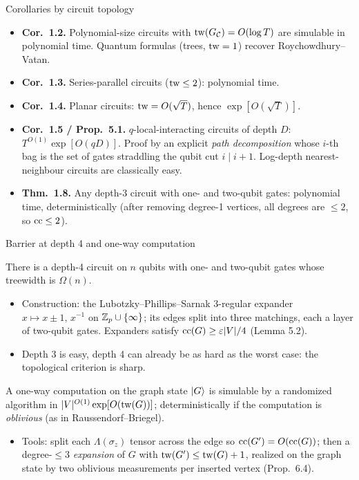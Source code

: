 \begin{frame}{Corollaries by circuit topology}
    \begin{itemize}
        \item \textbf{Cor.~1.2.} Polynomial-size circuits with $\operatorname{tw}(G_{\mathcal{C}})=O(\log T)$ are simulable in polynomial time. Quantum formulas (trees, $\operatorname{tw}=1$) recover Roychowdhury--Vatan.
        \item \textbf{Cor.~1.3.} Series-parallel circuits ($\operatorname{tw}\le 2$): polynomial time.
        \item \textbf{Cor.~1.4.} Planar circuits: $\operatorname{tw}=O(\sqrt{T})$, hence $\exp[O(\sqrt T)]$.
        \item \textbf{Cor.~1.5 / Prop.~5.1.} $q$-local-interacting circuits of depth $D$: $T^{O(1)}\exp[O(qD)]$. Proof by an explicit \emph{path decomposition} whose $i$-th bag is the set of gates straddling the qubit cut $i\mid i+1$. Log-depth nearest-neighbour circuits are classically easy.
        \item \textbf{Thm.~1.8.} Any depth-3 circuit with one- and two-qubit gates: polynomial time, deterministically (after removing degree-1 vertices, all degrees are $\le 2$, so $\operatorname{cc}\le 2$).
    \end{itemize}
\end{frame}

\begin{frame}{Barrier at depth 4 and one-way computation}
    \begin{thm}[Thm.~1.7]
        There is a depth-4 circuit on $n$ qubits with one- and two-qubit gates whose treewidth is $\Omega(n)$.
    \end{thm}
    \begin{itemize}
        \item Construction: the Lubotzky--Phillips--Sarnak 3-regular expander $x\mapsto x\pm1,\,x^{-1}$ on $\mathbb{Z}_p\cup\{\infty\}$; its edges split into three matchings, each a layer of two-qubit gates. Expanders satisfy $\operatorname{cc}(G)\ge\varepsilon|V|/4$ (Lemma 5.2).
        \item Depth 3 is easy, depth 4 can already be as hard as the worst case: the topological criterion is sharp.
    \end{itemize}
    \begin{thm}[Thm.~1.6 / 6.6]
        A one-way computation on the graph state $\ket{G}$ is simulable by a randomized algorithm in $|V|^{O(1)}\exp[O(\operatorname{tw}(G))]$; deterministically if the computation is \emph{oblivious} (as in Raussendorf--Briegel).
    \end{thm}
    \begin{itemize}
        \item Tools: split each $\Lambda(\sigma_z)$ tensor across the edge so $\operatorname{cc}(G')=O(\operatorname{cc}(G))$; then a degree-$\le3$ \emph{expansion} of $G$ with $\operatorname{tw}(G')\le\operatorname{tw}(G)+1$, realized on the graph state by two oblivious measurements per inserted vertex (Prop.~6.4).
    \end{itemize}
\end{frame}

